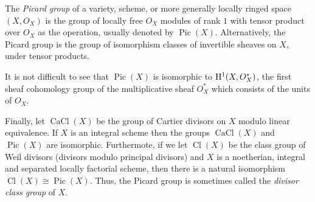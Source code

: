 \documentclass[12pt]{article}
\begin{document}
The {\em Picard group} of a variety, scheme, or more generally locally 
ringed space $(X,O_X)$ is the group of locally free $O_X$ modules of rank
$1$ with tensor product over $O_X$ as the operation, usually denoted by $\operatorname{Pic}(X)$. Alternatively, the Picard group is the group of isomorphism classes of invertible sheaves on $X$, under tensor products.

It is not difficult to see that $\operatorname{Pic}(X)$ is isomorphic to ${\rm H}^1(X, O_X^*)$, the 
first sheaf cohomology group of the multiplicative sheaf $O_X^*$ which consists of the
units of $O_X$. 

Finally, let $\operatorname{CaCl}(X)$ be the group of Cartier divisors on $X$ modulo linear equivalence. If $X$ is an integral scheme then the groups $\operatorname{CaCl}(X)$ and $\operatorname{Pic}(X)$ are isomorphic. Furthermote, if we let $\operatorname{Cl}(X)$ be the class group of Weil divisors (divisors modulo principal divisors) and $X$ is a  noetherian, integral and separated locally factorial scheme, then there is a natural isomorphism $\operatorname{Cl}(X)\cong \operatorname{Pic}(X)$. Thus, the Picard group is sometimes called the {\it divisor class group} of $X$.
\end{document}
